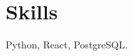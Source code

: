 \documentclass{article}
\begin{document}
            \section{Skills}
            Python, React, PostgreSQL.
            
\end{document}
